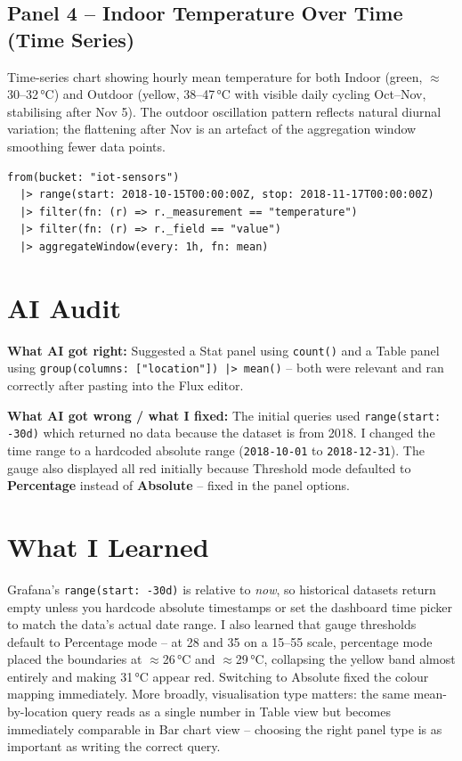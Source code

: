 \documentclass[11pt, letterpaper]{article}
\begin{document}
\subsection{Panel 4 -- Indoor Temperature Over Time (Time Series)}

Time-series chart showing hourly mean temperature for both Indoor (green,
$\approx$30--32\,°C) and Outdoor (yellow, 38--47\,°C with visible daily
cycling Oct--Nov, stabilising after Nov 5). The outdoor oscillation pattern
reflects natural diurnal variation; the flattening after Nov is an artefact
of the aggregation window smoothing fewer data points.

\begin{lstlisting}[caption={Panel 4 -- Hourly aggregated time series}]
from(bucket: "iot-sensors")
  |> range(start: 2018-10-15T00:00:00Z, stop: 2018-11-17T00:00:00Z)
  |> filter(fn: (r) => r._measurement == "temperature")
  |> filter(fn: (r) => r._field == "value")
  |> aggregateWindow(every: 1h, fn: mean)
\end{lstlisting}

\section{AI Audit}

\textbf{What AI got right:}
Suggested a Stat panel using \texttt{count()} and a Table panel using
\texttt{group(columns: ["location"]) |> mean()} -- both were relevant and ran
correctly after pasting into the Flux editor.

\textbf{What AI got wrong / what I fixed:}
The initial queries used \texttt{range(start: -30d)} which returned no data
because the dataset is from 2018. I changed the time range to a hardcoded
absolute range (\texttt{2018-10-01} to \texttt{2018-12-31}).
The gauge also displayed all red initially because Threshold mode defaulted
to \textbf{Percentage} instead of \textbf{Absolute} -- fixed in the panel options.

\section{What I Learned}

Grafana's \texttt{range(start: -30d)} is relative to \textit{now}, so historical
datasets return empty unless you hardcode absolute timestamps or set the dashboard
time picker to match the data's actual date range.
I also learned that gauge thresholds default to Percentage mode -- at 28 and 35
on a 15--55 scale, percentage mode placed the boundaries at $\approx$26\,°C and
$\approx$29\,°C, collapsing the yellow band almost entirely and making 31\,°C
appear red. Switching to Absolute fixed the colour mapping immediately.
More broadly, visualisation type matters: the same mean-by-location query reads
as a single number in Table view but becomes immediately comparable in Bar chart
view -- choosing the right panel type is as important as writing the correct query.
\end{document}
